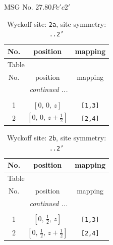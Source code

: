 \documentclass[fleqn,8pt]{jsarticle}
\begin{document}
\setcounter{MaxMatrixCols}{32}

\renewcommand{\tablename}{Table~}
\renewcommand{\figurename}{Figure~}
\begin{center}
\LARGE
MSG No. 27.80\quad$Pc'c2'$
\end{center}
\renewcommand{\arraystretch}{1.2}
\begin{longtable}{ccc}
\caption{Wyckoff site: {\tt 2a}, site symmetry: {\tt ..2'}}
 \\
 \hline \hline
No. & position & mapping \\ \hline \endfirsthead

\multicolumn{2}{l}{\tablename\ \thetable{}} \\
 \hline \hline
No. & position & mapping \\ \hline \endhead

 \hline \hline
\multicolumn{2}{r}{\footnotesize\it continued ...} \\ \endfoot

 \hline \hline
\multicolumn{2}{r}{} \\ \endlastfoot

1 & $\left[ 0,\, 0,\, z \right]$ & {\tt [1,3]} \\ \hline
2 & $\left[ 0,\, 0,\, z + \frac{1}{2} \right]$ & {\tt [2,4]} \\
\end{longtable}
\renewcommand{\arraystretch}{1.2}
\begin{longtable}{ccc}
\caption{Wyckoff site: {\tt 2b}, site symmetry: {\tt ..2'}}
 \\
 \hline \hline
No. & position & mapping \\ \hline \endfirsthead

\multicolumn{2}{l}{\tablename\ \thetable{}} \\
 \hline \hline
No. & position & mapping \\ \hline \endhead

 \hline \hline
\multicolumn{2}{r}{\footnotesize\it continued ...} \\ \endfoot

 \hline \hline
\multicolumn{2}{r}{} \\ \endlastfoot

1 & $\left[ 0,\, \frac{1}{2},\, z \right]$ & {\tt [1,3]} \\ \hline
2 & $\left[ 0,\, \frac{1}{2},\, z + \frac{1}{2} \right]$ & {\tt [2,4]} \\
\end{longtable}
\renewcommand{\arraystretch}{1.2}
\end{document}
